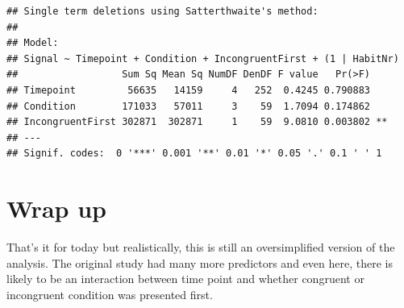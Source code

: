 \documentclass[
]{book}
\begin{document}
\begin{verbatim}
## Single term deletions using Satterthwaite's method:
## 
## Model:
## Signal ~ Timepoint + Condition + IncongruentFirst + (1 | HabitNr)
##                  Sum Sq Mean Sq NumDF DenDF F value   Pr(>F)   
## Timepoint         56635   14159     4   252  0.4245 0.790883   
## Condition        171033   57011     3    59  1.7094 0.174862   
## IncongruentFirst 302871  302871     1    59  9.0810 0.003802 **
## ---
## Signif. codes:  0 '***' 0.001 '**' 0.01 '*' 0.05 '.' 0.1 ' ' 1
\end{verbatim}

\hypertarget{wrap-up-3}{%
\section{Wrap up}\label{wrap-up-3}}

That's it for today but realistically, this is still an oversimplified version of the analysis. The original study had many more predictors and even here, there is likely to be an interaction between time point and whether congruent or incongruent condition was presented first.

  
\end{document}
